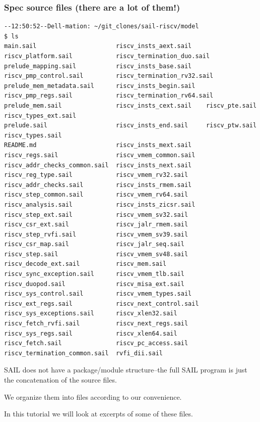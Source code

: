\documentclass[aspectratio=169]{beamer}
\newcommand{\slidefont}{\scriptsize}
\begin{document}
\begin{frame}[fragile]
  \frametitle{Spec source files (there are a lot of them!)}

  \tiny
  \begin{Verbatim}[frame=single]
--12:50:52--Dell-mation: ~/git_clones/sail-riscv/model
$ ls
main.sail                      riscv_insts_aext.sail    riscv_platform.sail            riscv_termination_duo.sail
prelude_mapping.sail           riscv_insts_base.sail    riscv_pmp_control.sail         riscv_termination_rv32.sail
prelude_mem_metadata.sail      riscv_insts_begin.sail   riscv_pmp_regs.sail            riscv_termination_rv64.sail
prelude_mem.sail               riscv_insts_cext.sail    riscv_pte.sail                 riscv_types_ext.sail
prelude.sail                   riscv_insts_end.sail     riscv_ptw.sail                 riscv_types.sail
README.md                      riscv_insts_mext.sail    riscv_regs.sail                riscv_vmem_common.sail
riscv_addr_checks_common.sail  riscv_insts_next.sail    riscv_reg_type.sail            riscv_vmem_rv32.sail
riscv_addr_checks.sail         riscv_insts_rmem.sail    riscv_step_common.sail         riscv_vmem_rv64.sail
riscv_analysis.sail            riscv_insts_zicsr.sail   riscv_step_ext.sail            riscv_vmem_sv32.sail
riscv_csr_ext.sail             riscv_jalr_rmem.sail     riscv_step_rvfi.sail           riscv_vmem_sv39.sail
riscv_csr_map.sail             riscv_jalr_seq.sail      riscv_step.sail                riscv_vmem_sv48.sail
riscv_decode_ext.sail          riscv_mem.sail           riscv_sync_exception.sail      riscv_vmem_tlb.sail
riscv_duopod.sail              riscv_misa_ext.sail      riscv_sys_control.sail         riscv_vmem_types.sail
riscv_ext_regs.sail            riscv_next_control.sail  riscv_sys_exceptions.sail      riscv_xlen32.sail
riscv_fetch_rvfi.sail          riscv_next_regs.sail     riscv_sys_regs.sail            riscv_xlen64.sail
riscv_fetch.sail               riscv_pc_access.sail     riscv_termination_common.sail  rvfi_dii.sail
  \end{Verbatim}

  \slidefont

  \begin{minipage}{\textwidth}
    SAIL does not have a package/module structure--the full SAIL
    program is just the concatenation of the source files.

    \vspace{1ex}

    We organize them into files according to our convenience.

    \vspace{1ex}

    In this tutorial we will look at excerpts of some of these files.
  \end{minipage}

\end{frame}
\end{document}
